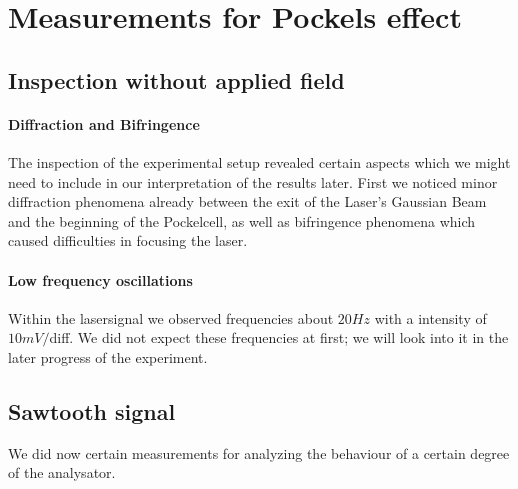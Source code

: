 \newcommand{\figdirpockels}{analysis_pockels/figures/}

\section{Measurements for Pockels effect}
\subsection{Inspection without applied field}
\paragraph{Diffraction and Bifringence}
The inspection of the experimental setup revealed certain aspects
which we might need to include in our interpretation of the results
later. First we noticed minor diffraction phenomena already between
the exit of the Laser's Gaussian Beam and the beginning of the
Pockelcell, as well as bifringence phenomena which caused difficulties
in focusing the laser.  
\paragraph{Low frequency oscillations} Within the lasersignal 
we observed frequencies about $20 Hz$ with a intensity of $10mV/$diff.
We did not expect these frequencies at first; we will look into it
in the later progress of the experiment.
\subsection{Sawtooth signal}
We did now certain measurements for analyzing the behaviour of a 
certain degree of the analysator.

